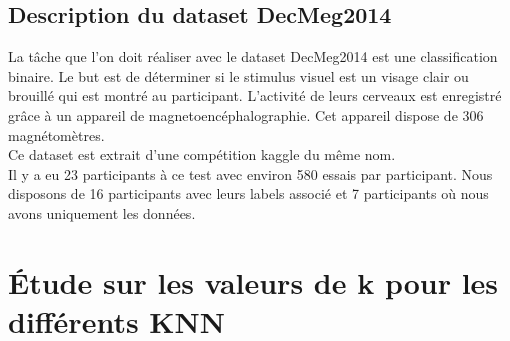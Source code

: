 \documentclass{article}[12pt]
\begin{document}
\subsection{Description du dataset DecMeg2014}
La tâche que l'on doit réaliser avec le dataset DecMeg2014 est une classification binaire. Le but est de déterminer si le stimulus visuel est un visage clair ou brouillé qui est montré au participant. L'activité de leurs cerveaux est enregistré grâce à un appareil de magnetoencéphalographie. Cet appareil dispose de 306 magnétomètres.
\\
Ce dataset est extrait d'une compétition kaggle du même nom.
\\
Il y a eu 23 participants à ce test avec environ 580 essais par participant. Nous disposons de 16 participants avec leurs labels associé et 7 participants où nous avons uniquement les données.


\section{Étude sur les valeurs de k pour les différents KNN}
\end{document}
